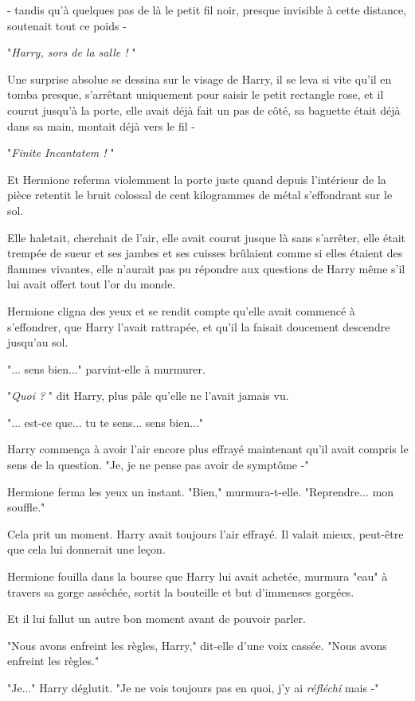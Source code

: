 - tandis qu'à quelques pas de là le petit fil noir, presque invisible à cette distance, soutenait tout ce poids -

"\emph{Harry, sors de la salle !} "

Une surprise absolue se dessina sur le visage de Harry, il se leva si vite qu'il en tomba presque, s'arrêtant uniquement pour saisir le petit rectangle rose, et il courut jusqu'à la porte, elle avait déjà fait un pas de côté, sa baguette était déjà dans sa main, montait déjà vers le fil -

"\emph{Finite Incantatem !} "

Et Hermione referma violemment la porte juste quand depuis l'intérieur de la pièce retentit le bruit colossal de cent kilogrammes de métal s'effondrant sur le sol.

Elle haletait, cherchait de l'air, elle avait courut jusque là sans s'arrêter, elle était trempée de sueur et ses jambes et ses cuisses brûlaient comme si elles étaient des flammes vivantes, elle n'aurait pas pu répondre aux questions de Harry même s'il lui avait offert tout l'or du monde.

Hermione cligna des yeux et se rendit compte qu'elle avait commencé à s'effondrer, que Harry l'avait rattrapée, et qu'il la faisait doucement descendre jusqu'au sol.

"... sens bien..." parvint-elle à murmurer.

"\emph{Quoi ?} " dit Harry, plus pâle qu'elle ne l'avait jamais vu.

"... est-ce que... tu te sens... sens bien..."

Harry commença à avoir l'air encore plus effrayé maintenant qu'il avait compris le sens de la question. "Je, je ne pense pas avoir de symptôme -"

Hermione ferma les yeux un instant. "Bien," murmura-t-elle. "Reprendre... mon souffle."

Cela prit un moment. Harry avait toujours l'air effrayé. Il valait mieux, peut-être que cela lui donnerait une leçon.

Hermione fouilla dans la bourse que Harry lui avait achetée, murmura "eau" à travers sa gorge asséchée, sortit la bouteille et but d'immenses gorgées.

Et il lui fallut un autre bon moment avant de pouvoir parler.

"Nous avons enfreint les règles, Harry," dit-elle d'une voix cassée. "Nous avons enfreint les règles."

"Je..." Harry déglutit. "Je ne vois toujours pas en quoi, j'y ai \emph{réfléchi}  mais -"

